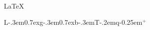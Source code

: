 \documentclass{article}
\begin{document}
\LaTeX

\def\LGBTQplus{{\rm \sc L\kern-.3em{\sc \raise0.7ex\hbox{g}}\kern-.3em\lower0.7ex\hbox{\sc b}\kern-.3em\hbox{T}\kern-.2em\sc q\kern-0.25em$^+$}}

\LGBTQplus
\end{document}
